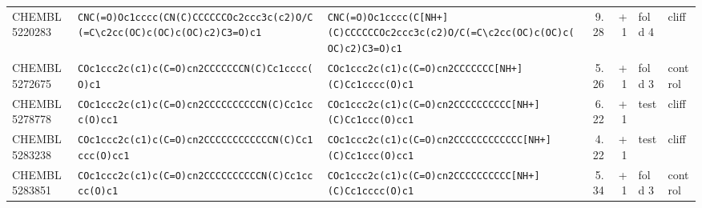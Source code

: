 \begin{longtable}{l p{4.4cm} p{4.4cm} r r l l}
CHEMBL5220283 & \texttt{CNC(\allowbreak{}=\allowbreak{}O)\allowbreak{}Oc1cccc(\allowbreak{}CN(\allowbreak{}C)\allowbreak{}CCCCCCOc2ccc3c(\allowbreak{}c2)\allowbreak{}O/\allowbreak{}C(\allowbreak{}=\allowbreak{}C\textbackslash{}c2cc(\allowbreak{}OC)\allowbreak{}c(\allowbreak{}OC)\allowbreak{}c(\allowbreak{}OC)\allowbreak{}c2)\allowbreak{}C3=\allowbreak{}O)\allowbreak{}c1} & \texttt{CNC(\allowbreak{}=\allowbreak{}O)\allowbreak{}Oc1cccc(\allowbreak{}C[NH+]\allowbreak{}(\allowbreak{}C)\allowbreak{}CCCCCCOc2ccc3c(\allowbreak{}c2)\allowbreak{}O/\allowbreak{}C(\allowbreak{}=\allowbreak{}C\textbackslash{}c2cc(\allowbreak{}OC)\allowbreak{}c(\allowbreak{}OC)\allowbreak{}c(\allowbreak{}OC)\allowbreak{}c2)\allowbreak{}C3=\allowbreak{}O)\allowbreak{}c1} & 9.28 & +1 & fold 4 & cliff \\
CHEMBL5272675 & \texttt{COc1ccc2c(\allowbreak{}c1)\allowbreak{}c(\allowbreak{}C=\allowbreak{}O)\allowbreak{}cn2CCCCCCCN(\allowbreak{}C)\allowbreak{}Cc1cccc(\allowbreak{}O)\allowbreak{}c1} & \texttt{COc1ccc2c(\allowbreak{}c1)\allowbreak{}c(\allowbreak{}C=\allowbreak{}O)\allowbreak{}cn2CCCCCCC[NH+]\allowbreak{}(\allowbreak{}C)\allowbreak{}Cc1cccc(\allowbreak{}O)\allowbreak{}c1} & 5.26 & +1 & fold 3 & control \\
CHEMBL5278778 & \texttt{COc1ccc2c(\allowbreak{}c1)\allowbreak{}c(\allowbreak{}C=\allowbreak{}O)\allowbreak{}cn2CCCCCCCCCCN(\allowbreak{}C)\allowbreak{}Cc1ccc(\allowbreak{}O)\allowbreak{}cc1} & \texttt{COc1ccc2c(\allowbreak{}c1)\allowbreak{}c(\allowbreak{}C=\allowbreak{}O)\allowbreak{}cn2CCCCCCCCCC[NH+]\allowbreak{}(\allowbreak{}C)\allowbreak{}Cc1ccc(\allowbreak{}O)\allowbreak{}cc1} & 6.22 & +1 & test & cliff \\
CHEMBL5283238 & \texttt{COc1ccc2c(\allowbreak{}c1)\allowbreak{}c(\allowbreak{}C=\allowbreak{}O)\allowbreak{}cn2CCCCCCCCCCCCN(\allowbreak{}C)\allowbreak{}Cc1ccc(\allowbreak{}O)\allowbreak{}cc1} & \texttt{COc1ccc2c(\allowbreak{}c1)\allowbreak{}c(\allowbreak{}C=\allowbreak{}O)\allowbreak{}cn2CCCCCCCCCCCC[NH+]\allowbreak{}(\allowbreak{}C)\allowbreak{}Cc1ccc(\allowbreak{}O)\allowbreak{}cc1} & 4.22 & +1 & test & cliff \\
CHEMBL5283851 & \texttt{COc1ccc2c(\allowbreak{}c1)\allowbreak{}c(\allowbreak{}C=\allowbreak{}O)\allowbreak{}cn2CCCCCCCCCCN(\allowbreak{}C)\allowbreak{}Cc1cccc(\allowbreak{}O)\allowbreak{}c1} & \texttt{COc1ccc2c(\allowbreak{}c1)\allowbreak{}c(\allowbreak{}C=\allowbreak{}O)\allowbreak{}cn2CCCCCCCCCC[NH+]\allowbreak{}(\allowbreak{}C)\allowbreak{}Cc1cccc(\allowbreak{}O)\allowbreak{}c1} & 5.34 & +1 & fold 3 & control \\

\end{longtable}
